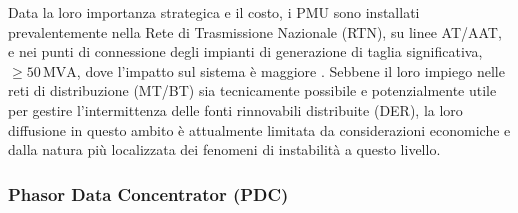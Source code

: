 



Data la loro importanza strategica e il costo, i PMU sono installati prevalentemente nella Rete di Trasmissione Nazionale (RTN), su linee AT/AAT, e nei punti di connessione degli impianti di generazione di taglia significativa, $\geq 50\,\text{MVA}$, dove l'impatto sul sistema è maggiore \cite{Fase-di-rete-terna}. Sebbene il loro impiego nelle reti di distribuzione (MT/BT) sia tecnicamente possibile e potenzialmente utile per gestire l'intermittenza delle fonti rinnovabili distribuite (DER), la loro diffusione in questo ambito è attualmente limitata da considerazioni economiche e dalla natura più localizzata dei fenomeni di instabilità a questo livello.


\subsubsection{Phasor Data Concentrator (PDC)}



